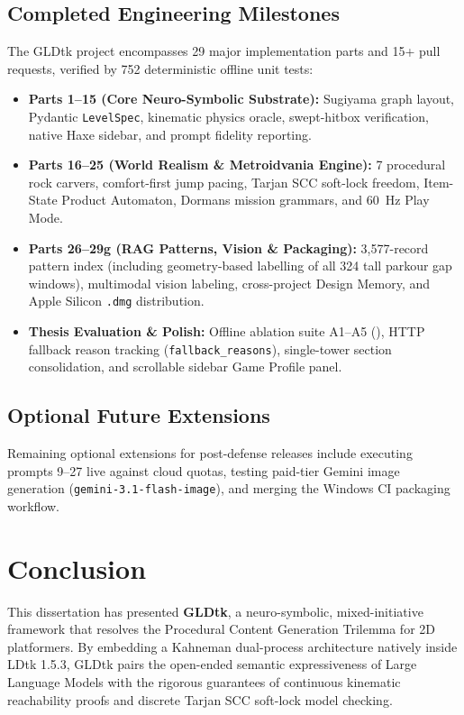 \documentclass[11pt,a4paper]{report}
\theoremstyle{definition}
\theoremstyle{remark}
\begin{document}
\section{Completed Engineering Milestones}
The GLDtk project encompasses 29 major implementation parts and 15+ pull requests, verified by 752 deterministic offline unit tests:
\begin{itemize}
    \item \textbf{Parts 1--15 (Core Neuro-Symbolic Substrate):} Sugiyama graph layout, Pydantic \texttt{LevelSpec}, kinematic physics oracle, swept-hitbox verification, native Haxe sidebar, and prompt fidelity reporting.
    \item \textbf{Parts 16--25 (World Realism \& Metroidvania Engine):} 7 procedural rock carvers, comfort-first jump pacing, Tarjan SCC soft-lock freedom, Item-State Product Automaton, Dormans mission grammars, and 60~Hz Play Mode.
    \item \textbf{Parts 26--29g (RAG Patterns, Vision \& Packaging):} 3,577-record pattern index (including geometry-based labelling of all 324 tall parkour gap windows), multimodal vision labeling, cross-project Design Memory, and Apple Silicon \texttt{.dmg} distribution.
    \item \textbf{Thesis Evaluation & Polish:} Offline ablation suite A1--A5 (), HTTP fallback reason tracking (\texttt{fallback\_reasons}), single-tower section consolidation, and scrollable sidebar Game Profile panel.
\end{itemize}

\section{Optional Future Extensions}
Remaining optional extensions for post-defense releases include executing prompts 9--27 live against cloud quotas, testing paid-tier Gemini image generation (\texttt{gemini-3.1-flash-image}), and merging the Windows CI packaging workflow.

\chapter{Conclusion}
\label{chap:conclusion}
This dissertation has presented \textbf{GLDtk}, a neuro-symbolic, mixed-initiative framework that resolves the Procedural Content Generation Trilemma for 2D platformers. By embedding a Kahneman dual-process architecture natively inside LDtk 1.5.3, GLDtk pairs the open-ended semantic expressiveness of Large Language Models with the rigorous guarantees of continuous kinematic reachability proofs and discrete Tarjan SCC soft-lock model checking.
\end{document}
